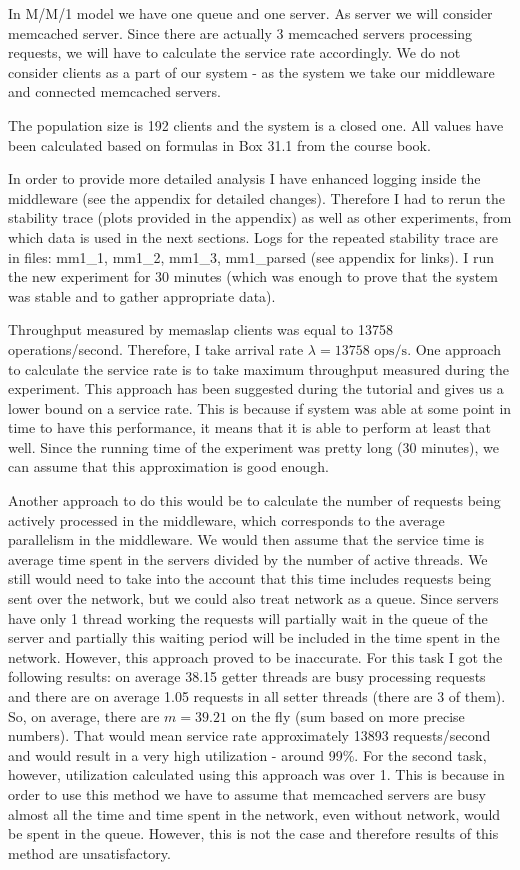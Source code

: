 \documentclass[11pt]{article}
\begin{document}
In M/M/1 model we have one queue and one server. As server we will consider memcached server. Since there are actually 3 memcached servers processing requests, we will have to calculate the service rate accordingly. We do not consider clients as a part of our system - as the system we take our middleware and connected memcached servers.

The population size is 192 clients and the system is a closed one. All values have been calculated based on formulas in Box 31.1 from the course book.

In order to provide more detailed analysis I have enhanced logging inside the middleware (see the appendix for detailed changes). Therefore I had to rerun the stability trace (plots provided in the appendix) as well as other experiments, from which data is used in the next sections. Logs for the repeated stability trace are in files: mm1\_1, mm1\_2, mm1\_3, mm1\_parsed (see appendix for links). I run the new experiment for 30 minutes (which was enough to prove that the system was stable and to gather appropriate data).

Throughput measured by memaslap clients was equal to 13758 operations/second. Therefore, I take arrival rate $\lambda = 13758 \textrm{ ops/s}$. One approach to calculate the service rate is to take maximum throughput measured during the experiment. This approach has been suggested during the tutorial and gives us a lower bound on a service rate. This is because if system was able at some point in time to have this performance, it means that it is able to perform at least that well. Since the running time of the experiment was pretty long (30 minutes), we can assume that this approximation is good enough.

Another approach to do this would be to calculate the number of requests being actively processed in the middleware, which corresponds to the average parallelism in the middleware. We would then assume that the service time is average time spent in the servers divided by the number of active threads. We still would need to take into the account that this time includes requests being sent over the network, but we could also treat network as a queue. Since servers have only 1 thread working the requests will partially wait in the queue of the server and partially this waiting period will be included in the time spent in the network. However, this approach proved to be inaccurate. For this task I got the following results: on average 38.15 getter threads are busy processing requests and there are on average 1.05 requests in all setter threads (there are 3 of them). So, on average, there are $m = 39.21$ on the fly (sum based on more precise numbers). That would mean service rate approximately 13893 requests/second and would result in a very high utilization - around 99\%. For the second task, however, utilization calculated using this approach was over 1. This is because in order to use this method we have to assume that memcached servers are busy almost all the time and time spent in the network, even without network, would be spent in the queue. However, this is not the case and therefore results of this method are unsatisfactory. 
\end{document}
